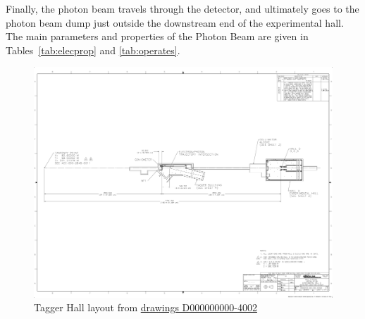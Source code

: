 Finally, the photon beam travels through the \GX{} detector, and
ultimately goes to the photon beam dump just outside the downstream
end of the experimental hall.
The main parameters and properties of the Photon Beam are given in
Tables~\ref{tab:elecprop} and \ref{tab:operates}.

\begin{figure}[ht]
\begin{center}
   \includegraphics[page=4,viewport=581 1311 3020 2340,clip,angle=0,width=0.98\linewidth]{figures/D000000000-4002_RevB}
\end{center}
\caption{Tagger Hall layout
         from \href{https://misportal.jlab.org/jlabDocs/document.seam?id=80930}{drawings D000000000-4002}
        }
\label{fig:beam:tagger-hall} 
\end{figure}




